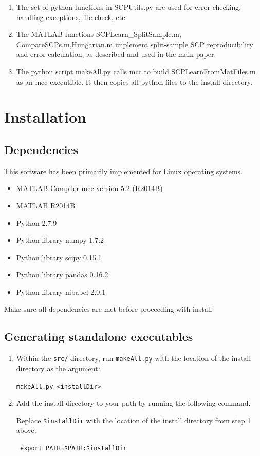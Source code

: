 \documentclass[12pt]{article}
\begin{document}
\begin{enumerate}
\item The set of python functions in {\color{blue}SCPUtils.py} are used for error checking, handling exceptions, file check, etc
\item The MATLAB functions {\color{magenta}SCPLearn\_SplitSample.m}, {\color{magenta}CompareSCPs.m},{\color{magenta}Hungarian.m} implement split-sample SCP reproducibility and error calculation, as described and used in the main paper.
\item The python script {\color{blue}makeAll.py} calls mcc to build {\color{magenta}SCPLearnFromMatFiles.m} as an mcc-executible. It then copies all python files to the install directory.
\end{enumerate}

\section{Installation}
\subsection{Dependencies}
This software has been primarily implemented for Linux operating systems.
\begin{itemize}
\item MATLAB Compiler mcc version 5.2 (R2014B)
\item MATLAB R2014B
\item Python 2.7.9
\item Python library numpy 1.7.2
\item Python library scipy 0.15.1
\item Python library pandas 0.16.2
\item Python library nibabel 2.0.1
\end{itemize}
Make sure all dependencies are met before proceeding with install.

\subsection{Generating standalone executables}

\begin{enumerate}
\item Within the \texttt{src/}  directory, run \texttt{makeAll.py}  with the location of the install directory as the argument:

\texttt{makeAll.py <installDir>}

\item Add the install directory to your path by running the following command. 

Replace \texttt{\${installDir}} with the location of the install directory from step 1 above.

\texttt{ export PATH=\${PATH}:\${installDir} }

\end{enumerate}
\end{document}
